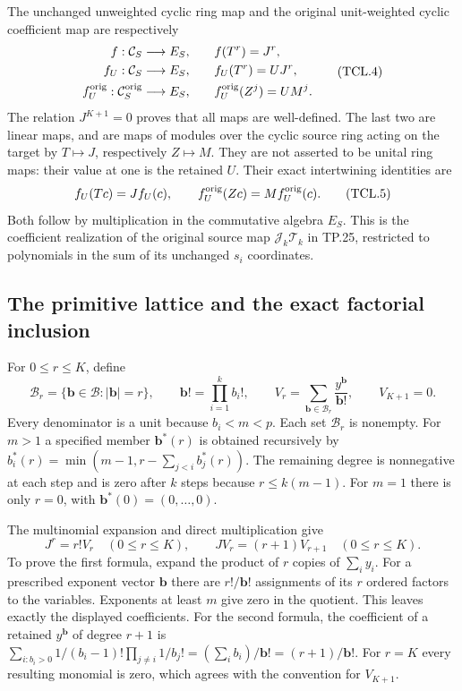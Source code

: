 The unchanged unweighted cyclic ring map and the original unit-weighted
cyclic coefficient map are respectively
\[
 \begin{split}
 f:\mathcal C_S\longrightarrow E_S,&\qquad f(T^r)=J^r,\\
 f_U:\mathcal C_S\longrightarrow E_S,&\qquad f_U(T^r)=U J^r,\\
 f_U^{\rm orig}:\mathcal C_S^{\rm orig}\longrightarrow E_S,
 &\qquad f_U^{\rm orig}(Z^j)=U M^j.
 \end{split}
 \tag{TCL.4}\label{eq:tcl-original-map}
\]
The relation \(J^{K+1}=0\) proves that all maps are well-defined.
The last two are linear maps, and are maps of modules over the cyclic
source ring acting on the target by \(T\mapsto J\), respectively
\(Z\mapsto M\). They are not asserted to be unital ring maps:
their value at one is the retained \(U\). Their exact intertwining
identities are
\[
 f_U(Tc)=Jf_U(c),\qquad
 f_U^{\rm orig}(Zc)=M f_U^{\rm orig}(c).
 \tag{TCL.5}\label{eq:tcl-intertwining}
\]
Both follow by multiplication in the commutative algebra \(E_S\).
This is the coefficient realization of the original source map
\(\mathcal J_k\mathcal T_k\) in TP.25, restricted to polynomials
in the sum of its unchanged \(s_i\) coordinates.

\subsection{The primitive lattice and the exact factorial inclusion}

For \(0\leq r\leq K\), define
\[
 \mathcal B_r=\{\mathbf b\in\mathcal B:|\mathbf b|=r\},\qquad
 \mathbf b!=\prod_{i=1}^k b_i!,\qquad
 V_r=\sum_{\mathbf b\in\mathcal B_r}\frac{y^{\mathbf b}}{\mathbf b!},
 \qquad V_{K+1}=0.
 \tag{TCL.6}\label{eq:tcl-divided}
\]
Every denominator is a unit because \(b_i<m<p\). Each set
\(\mathcal B_r\) is nonempty. For \(m>1\) a specified member
\(\mathbf b^*(r)\) is obtained recursively by
\(b_i^*(r)=\min(m-1,r-\sum_{j<i}b_j^*(r))\).
The remaining degree is nonnegative at each step and is zero after
\(k\) steps because \(r\leq k(m-1)\). For \(m=1\) there is only
\(r=0\), with \(\mathbf b^*(0)=(0,\ldots,0)\).

The multinomial expansion and direct multiplication give
\[
 J^r=r!V_r\quad(0\leq r\leq K),\qquad
 J V_r=(r+1)V_{r+1}\quad(0\leq r\leq K).
 \tag{TCL.7}\label{eq:tcl-factorial}
\]
To prove the first formula, expand the product of \(r\) copies
of \(\sum_i y_i\). For a prescribed exponent vector \(\mathbf b\)
there are \(r!/\mathbf b!\) assignments of its \(r\) ordered
factors to the variables. Exponents at least \(m\) give zero in
the quotient. This leaves exactly the displayed coefficients.
For the second formula, the coefficient of a retained
\(y^{\mathbf b}\) of degree \(r+1\) is
\(\sum_{i:b_i>0}1/(b_i-1)!\prod_{j\ne i}1/b_j!
=(\sum_i b_i)/\mathbf b!=(r+1)/\mathbf b!\).
For \(r=K\) every resulting monomial is zero, which agrees with
the convention for \(V_{K+1}\).

